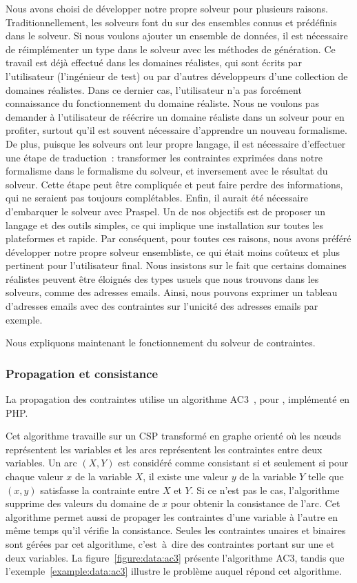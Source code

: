 Nous avons choisi de développer notre propre solveur pour plusieurs raisons.
Traditionnellement, les solveurs font du  sur des ensembles
connus et prédéfinis dans le solveur. Si nous voulons ajouter un ensemble de
données, il est nécessaire de réimplémenter un type dans le solveur avec les
méthodes de génération. Ce travail est déjà effectué dans les domaines
réalistes, qui sont écrits par l'utilisateur (l'ingénieur de test) ou par
d'autres développeurs d'une collection de domaines réalistes. Dans ce dernier
cas, l'utilisateur n'a pas forcément connaissance du fonctionnement du domaine
réaliste. Nous ne voulons pas demander à l'utilisateur de réécrire un domaine
réaliste dans un solveur pour en profiter, surtout qu'il est souvent nécessaire
d'apprendre un nouveau formalisme. De plus, puisque les solveurs ont leur propre
langage, il est nécessaire d'effectuer une étape de traduction~: transformer les
contraintes exprimées dans notre formalisme dans le formalisme du solveur, et
inversement avec le résultat du solveur. Cette étape peut être compliquée et
peut faire perdre des informations, qui ne seraient pas toujours complétables.
Enfin, il aurait été nécessaire d'embarquer le solveur avec Praspel. Un de nos
objectifs est de proposer un langage et des outils simples, ce qui implique une
installation sur toutes les plateformes et rapide. Par conséquent, pour toutes
ces raisons, nous avons préféré développer notre propre solveur ensembliste, ce
qui était moins coûteux et plus pertinent pour l'utilisateur final. Nous
insistons sur le fait que certains domaines réalistes peuvent être éloignés des
types usuels que nous trouvons dans les solveurs, comme des adresses emails.
Ainsi, nous pouvons exprimer un tableau d'adresses emails avec des contraintes
sur l'unicité des adresses emails par exemple.

Nous expliquons maintenant le fonctionnement du solveur de contraintes.

\subsubsection{Propagation et consistance}

La propagation des contraintes utilise un algorithme AC3~,
pour , implémenté en PHP.

Cet algorithme travaille sur un CSP transformé en graphe orienté où les nœuds
représentent les variables et les arcs représentent les contraintes entre deux
variables. Un arc $(X, Y)$ est considéré comme consistant si et seulement si
pour chaque valeur $x$ de la variable $X$, il existe une valeur $y$ de la
variable $Y$ telle que $(x, y)$ satisfasse la contrainte entre $X$ et $Y$.  Si
ce n'est pas le cas, l'algorithme supprime des valeurs du domaine de $x$ pour
obtenir la consistance de l'arc. Cet algorithme permet aussi de propager les
contraintes d'une variable à l'autre en même temps qu'il vérifie la consistance.
Seules les contraintes unaires et binaires sont gérées par cet algorithme,
c'est~à~dire des contraintes portant sur une et deux variables. La
figure~\ref{figure:data:ac3} présente l'algorithme AC3, tandis que
l'exemple~\ref{example:data:ac3} illustre le problème auquel répond cet
algorithme.

